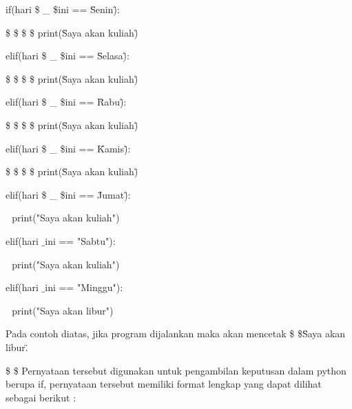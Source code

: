 \vspace{\baselineskip}
if(hari \$  \_  \$ini == \"Senin\"): \par
\noindent 
\vspace{\baselineskip}
 \$  \$  \$  \$ print(\"Saya akan kuliah\") \par
\noindent 
\vspace{\baselineskip}
elif(hari \$  \_  \$ini == \"Selasa\"): \par
\noindent 
\vspace{\baselineskip}
 \$  \$  \$  \$ print(\"Saya akan kuliah\") \par
\noindent 
\vspace{\baselineskip}
elif(hari \$  \_  \$ini == \"Rabu\"): \par
\noindent 
\vspace{\baselineskip}
 \$  \$  \$  \$ print(\"Saya akan kuliah\") \par
\noindent 
\vspace{\baselineskip}
elif(hari \$  \_  \$ini == \"Kamis\"): \par
\noindent 
\vspace{\baselineskip}
 \$  \$  \$  \$ print(\"Saya akan kuliah\") \par
\noindent 
\vspace{\baselineskip}
elif(hari \$  \_  \$ini == \"Jumat\"): \par
\noindent 
\vspace{\baselineskip}
 $  $  $  $ print("Saya akan kuliah") \par
\noindent 
\vspace{\baselineskip}
elif(hari $  \_  $ini == "Sabtu"): \par
\noindent 
\vspace{\baselineskip}
 $  $  $  $ print("Saya akan kuliah") \par
\noindent 
\vspace{\baselineskip}
elif(hari $  \_  $ini == "Minggu"): \par
\noindent 
\vspace{\baselineskip}
 $  $  $  $ print("Saya akan libur") \par
\noindent 
\vspace{\baselineskip}
\vspace{\baselineskip}
Pada contoh diatas, jika program dijalankan maka akan mencetak \$  
\$\"Saya akan libur\". \par
\noindent 
 \$  \$ Pernyataan tersebut digunakan untuk pengambilan keputusan dalam python berupa if, pernyataan tersebut memiliki format lengkap  yang dapat dilihat sebagai berikut : \par

